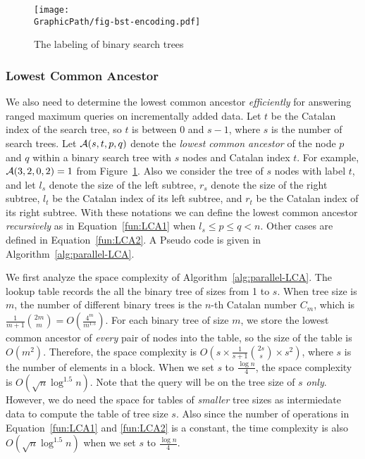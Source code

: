 \begin{figure}[!thb]
  \centering
  \texttt{[image: \\GraphicPath/fig-bst-encoding.pdf]}
  \caption{The labeling of binary search trees}
  \label{fig:labelingBST}
\end{figure}

\subsubsection{Lowest Common Ancestor}

We also need to determine the lowest common ancestor {\em efficiently}
for answering ranged maximum queries on incrementally added data.  Let
$t$ be the Catalan index of the search tree, so $t$ is between 0 and
$s - 1$, where $s$ is the number of search trees.  Let ${\cal A}(s, t,
p, q)$ denote the {\em lowest common ancestor} of the node $p$ and $q$
within a binary search tree with $s$ nodes and Catalan index $t$.  For
example, ${\cal A}(3, 2, 0, 2) = 1$ from Figure~\ref{fig:labelingBST}.
Also we consider the tree of $s$ nodes with label $t$, and let $l_s$
denote the size of the left subtree, $r_s$ denote the size of the
right subtree, $l_t$ be the Catalan index of its left subtree, and
$r_t$ be the Catalan index of its right subtree.  With these notations
we can define the lowest common ancestor {\em recursively} as in
Equation~\ref{fun:LCA1} when $l_s \le p \le q < n$.  Other cases are
defined in Equation~\ref{fun:LCA2}.  A Pseudo code is given in
Algorithm~\ref{alg:parallel-LCA}.





We first analyze the space complexity of
Algorithm~\ref{alg:parallel-LCA}.  The lookup table records the all
the binary tree of sizes from 1 to $s$.  When tree size is $m$, the
number of different binary trees is the $n$-th Catalan number $C_m$,
which is $\frac{1}{m+1}\binom{2m}{m} = O(\frac{4^m}{m^{1.5}})$.  For
each binary tree of size $m$, we store the lowest common ancestor of
{\em every} pair of nodes into the table, so the size of the table is
$O(m^2)$.  Therefore, the space complexity is $O(s \times
\frac{1}{s+1}\binom{2s}{s} \times s^2)$, where $s$ is the number of
elements in a block.  When we set $s$ to $\frac{\log n}{4}$, the space
complexity is $O(\sqrt{n} \log ^{1.5} n)$.  Note that the query will
be on the tree size of $s$ {\em only}.  However, we do need the space
for tables of {\em smaller} tree sizes as intermiedate data to compute
the table of tree size $s$.  Also since the number of operations in
Equation~\ref{fun:LCA1} and \ref{fun:LCA2} is a constant, the time
complexity is also $O(\sqrt{n} \log ^{1.5} n)$ when we set $s$ to
$\frac{\log n}{4}$.

